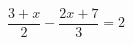\begin{ex}[type=equation]
	\begin{condition}
		$\dfrac{3+x}{2}-\dfrac{2x+7}{3}=2$
	\end{condition}
\end{ex}